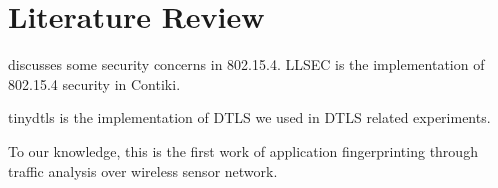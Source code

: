\chapter{Literature Review} \label{Chp: LiteratureReview}
\cite{802154Sec} discusses some security concerns in 802.15.4.  LLSEC\cite{LLSEC} is the implementation of 802.15.4 security in Contiki.

tinydtls\cite{tinydtls} is the implementation of DTLS we used in DTLS related experiments.

To our knowledge, this is the first work of application fingerprinting through traffic analysis over wireless sensor network.
